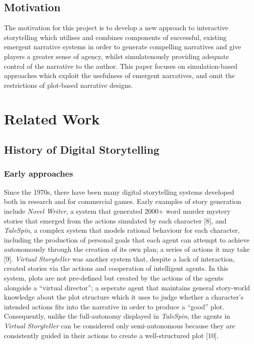 \documentclass{sig-alternate-05-2015}
\begin{document}
\subsection{Motivation}

\noindent The motivation for this project is to develop a new approach to interactive storytelling which utilises and combines components of successful, existing emergent narrative systems in order to generate compelling narratives and give players a greater sense of agency, whilst simulatenously providing adequate control of the narrative to the author. This paper focuses on simulation-based approaches which exploit the usefulness of emergent narratives, and omit the restrictions of plot-based narrative designs.

\section{Related Work}
\subsection{History of Digital Storytelling}
\subsubsection{Early approaches}
Since the 1970s, there have been many digital storytelling systems developed both in research and for commercial games. Early examples of story generation include \textit{Novel Writer}, a system that generated 2000+ word murder mystery stories that emerged from the actions simulated by each character [8], and \textit{TaleSpin}, a complex system that models rational behaviour for each character, including the production of personal goals that each agent can attempt to achieve autonomously through the creation of its own plan; a series of actions it may take [9]. \textit{Virtual Storyteller} was another system that, despite a lack of interaction, created stories via the actions and cooperation of intelligent agents. In this system, plots are not pre-defined but created by the actions of the agents alongside a ``virtual director''; a seperate agent that maintains general story-world knowledge about the plot structure which it uses to judge whether a character's intended actions fits into the narrative in order to produce a ``good'' plot. Consequently, unlike the full-autonomy displayed in \textit{TaleSpin}, the agents in \textit{Virtual Storyteller} can be considered only semi-autonomous because they are consistently guided in their actions to create a well-structured plot [10]. 
\end{document}

